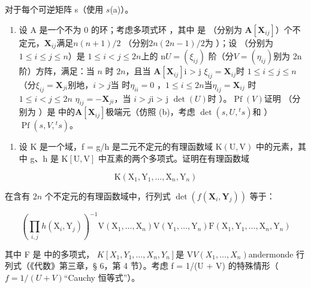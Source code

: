 对于每个可逆矩阵 s（使用 \(s\)(a)）。

\begin{enumerate}
\def\labelenumi{(\alph{enumi})}
\setcounter{enumi}{2}
\tightlist
\item
  设 A 是一个不为 0 的环；考虑多项式环 ，其中  是 （分别为 \(\mathbf{A}[\mathbf{X}_{ij}]\)）个不定元，\(\mathbf{X}_{ij}\)满足\(n(n + 1)/2\) （分别\(2n(2n - 1)/2\)为 ）；设 （分别为 \(1 \leqslant i \leqslant j \leqslant n\)）是  \(1 \leqslant i < j \leqslant 2n\)上的 n\(U = (\xi_{ij})\) 阶（分\(V = (\eta_{ij})\)别为 2n 阶）方阵，满足：当 \(n\) 时 \(2n\)，且当 \(\mathbf{A}[\mathbf{X}_{ij}]\)i > j \(\xi_{ij} = \mathbf{X}_{ij}\)时 \(1 \leqslant i \leqslant j \leqslant n\)（分\(\xi_{ij} = \mathbf{X}_{ji}\)别地，\(i > j\)当  时\(\eta_{ii} = 0\) ，\(1 \leqslant i \leqslant 2n\)当\(\eta_{ij} = \mathbf{X}_{ij}\)  时\(1 \leqslant i < j \leqslant 2n\) \(\eta_{ij} = -\mathbf{X}_{ji}\)，当 \(i > j\)i > j \(\det(U)\)时 ）。\(\operatorname{Pf}(V)\)证明 （分别为 ）是  中的\(\mathbf{A}[\mathbf{X}_{ij}]\)极端元（仿照 (b)，考虑  \(\det(s, U, {}^ts)\)和 ）\(\operatorname{Pf}(s, V, {}^ts)\)。
\end{enumerate}

\begin{enumerate}
\def\labelenumi{\arabic{enumi}.}
\setcounter{enumi}{17}
\tightlist
\item
  设 K 是一个域，f = g/h 是二元不定元的有理函数域 \(\mathrm{K}(\mathrm{U}, \mathrm{V})\) 中的元素，其中 g、h 是 \(\mathrm{K}[\mathrm{U}, \mathrm{V}]\) 中互素的两个多项式。证明在有理函数域
\end{enumerate}

\[
\mathrm{K} \left(\mathrm{X} _ {1}, \mathrm{Y} _ {1}, \dots , \mathrm{X} _ {n}, \mathrm{Y} _ {n}\right)
\]

在含有 \(2n\) 个不定元的有理函数域中，行列式 \(\operatorname{det}(f(\mathbf{X}_i, \mathbf{Y}_j))\) 等于：

\[
\left(\prod_ {i, j} h \left(\mathrm{X} _ {i}, \mathrm{Y} _ {j}\right)\right) ^ {- 1} \mathrm{V} \left(\mathrm{X} _ {1}, \dots , \mathrm{X} _ {n}\right) \mathrm{V} \left(\mathrm{Y} _ {1}, \dots , \mathrm{Y} _ {n}\right) \mathrm{F} \left(\mathrm{X} _ {1}, \mathrm{Y} _ {1}, \dots , \mathrm{X} _ {n}, \mathrm{Y} _ {n}\right)
\]

其中 F 是  中的多项式， \(K[X_{1}, Y_{1}, \ldots, X_{n}, Y_{n}]\)是 V\(V(X_{1}, \ldots, X_{n})\)andermonde 行列式（《代数》第三章，§ 6，第 4 节）。考虑 f = 1/(U + V) 的特殊情形（\(f = 1/(U + V)\)“Cauchy 恒等式”）。

